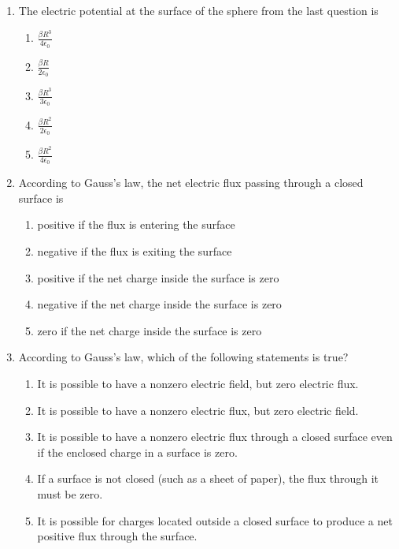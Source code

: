 \documentclass{../../oss-apphys}
\begin{document}
\begin{multicols}{2}
\begin{enumerate}[leftmargin=18pt]
  \item The electric potential at the surface of the sphere from the last
    question is
    \begin{enumerate}[noitemsep,topsep=0pt,leftmargin=18pt,label=(\Alph*)]
    \item $\displaystyle\frac{\beta R^3}{4\epsilon_0}$
    \item $\displaystyle\frac{\beta R}{2\epsilon_0}$
    \item $\displaystyle\frac{\beta R^3}{3\epsilon_0}$
    \item $\displaystyle\frac{\beta R^2}{2\epsilon_0}$
    \item $\displaystyle\frac{\beta R^2}{4\epsilon_0}$
    \end{enumerate}

  \item According to Gauss's law, the net electric flux passing through a closed
    surface is
    \begin{enumerate}[noitemsep,topsep=0pt,leftmargin=18pt,label=(\Alph*)]
    \item positive if the flux is entering the surface
    \item negative if the flux is exiting the surface
    \item positive if the net charge inside the surface is zero
    \item negative if the net charge inside the surface is zero
    \item zero if the net charge inside the surface is zero
    \end{enumerate}

    \columnbreak
    
  \item According to Gauss's law, which of the following statements is true?
    \begin{enumerate}[noitemsep,topsep=0pt,leftmargin=18pt,label=(\Alph*)]
    \item It is possible to have a nonzero electric field, but zero electric
      flux.
    \item It is possible to have a nonzero electric flux, but zero electric
      field.
    \item It is possible to have a nonzero electric flux through a closed
      surface even if the enclosed charge in a surface is zero.
    \item If a surface is not closed (such as a sheet of paper), the flux
      through it must be zero.
    \item It is possible for charges located outside a closed surface to produce
      a net positive flux through the surface.
    \end{enumerate}


\end{enumerate}
\end{multicols}
\end{document}

